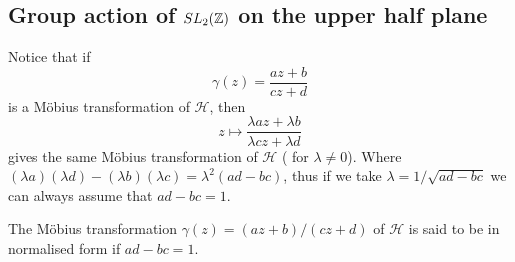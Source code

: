 \subsection{Group action of $SL_2(\mathbb{Z})$ on the upper half plane}

\begin{remark}\label{rem:Normalise}
Notice that if 
$$\gamma(z) = \frac{az + b}{cz +d}$$
is a Möbius transformation of $\mathcal{H}$, then
$$ z \mapsto \frac{\lambda az + \lambda b }{ \lambda cz + \lambda d}$$
gives the same Möbius transformation of $\mathcal{H}$ ( for $\lambda \neq 0$). Where $(\lambda a)(\lambda d) - (\lambda b) (\lambda c) = \lambda^2(ad -bc)$, thus if we take $\lambda = 1/\sqrt{ad -bc}$ we can always assume that $ad -bc =1$.
\end{remark}


\begin{definition}
The Möbius transformation $\gamma(z) = (az +b)/(cz+d)$ of $\mathcal{H}$ is said to be in normalised form if $ad -bc = 1$. 
\end{definition}

